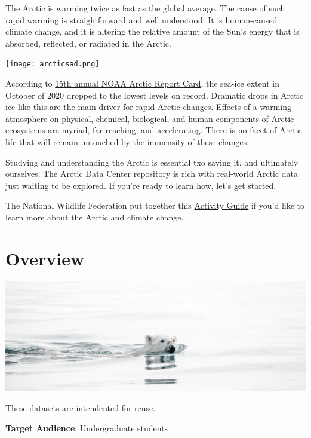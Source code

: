 \documentclass[]{book}
\begin{document}
The Arctic is warming twice as fast as the global average. The cause of such rapid warming is straightforward and well understood: It is human-caused climate change, and it is altering the relative amount of the Sun's energy that is absorbed, reflected, or radiated in the Arctic.

\texttt{[image: arcticsad.png]}

According to \href{https://arctic.noaa.gov/Report-Card/Report-Card-2020}{15th annual NOAA Arctic Report Card}, the sea-ice extent in October of 2020 dropped to the lowest levels on record. Dramatic drops in Arctic ice like this are the main driver for rapid Arctic changes. Effects of a warming atmosphere on physical, chemical, biological, and human components of Arctic ecosystems are myriad, far-reaching, and accelerating. There is no facet of Arctic life that will remain untouched by the immensity of these changes.

Studying and understanding the Arctic is essential txo saving it, and ultimately ourselves. The Arctic Data Center repository is rich with real-world Arctic data just waiting to be explored. If you're ready to learn how, let's get started.

The National Wildlife Federation put together this \href{https://www.nwf.org/~/media/PDFs/Be\%20Out\%20There/Schoolyard\%20Habitats/ArcticEnvironment.pdf}{Activity Guide} if you'd like to learn more about the Arctic and climate change.

\hypertarget{intro}{%
\chapter*{\texorpdfstring{\textbf{Overview}}{Overview}}\label{intro}}

\includegraphics{banners2.png}

These datasets are intendented for reuse.

\textbf{Target Audience}: Undergraduate students
\end{document}
